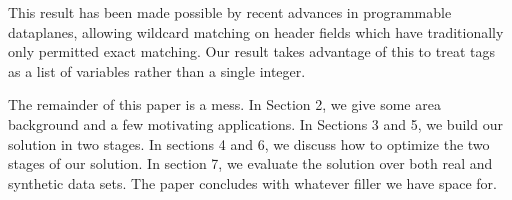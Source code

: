 This result has been made possible by recent advances in programmable dataplanes, allowing wildcard matching on header fields which have traditionally only permitted exact matching. Our result takes advantage of this to treat tags as a list of variables rather than a single integer. 


The remainder of this paper is a mess. In Section 2, we give some area background and a few motivating applications. In Sections 3 and 5, we build our solution in two stages. In sections 4 and 6, we discuss how to optimize the two stages of our solution. In section 7, we evaluate the solution over both real and synthetic data sets. The paper concludes with whatever filler we have space for.






%

